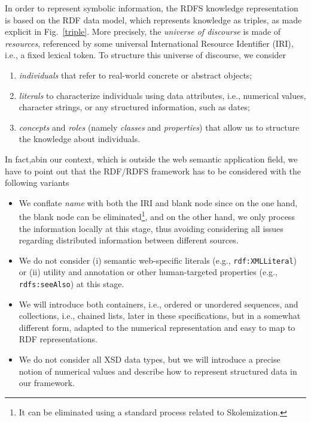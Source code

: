\documentclass[sn-mathphys]{sn-jnl}
\begin{document}
\begin{appendices}
In order to represent symbolic information, the RDFS knowledge representation is based on the RDF data model, which represents knowledge as triples, as made explicit in Fig.~\ref{triple}. More precisely, the \emph{universe of discourse} is made of \emph{resources}, referenced by some universal International Resource Identifier (IRI), i.e., a fixed lexical token. To structure this universe of discourse, we consider \begin{enumerate}[label=(\roman*)]
    \item \emph{individuals} that refer to real-world concrete or abstract objects; 
    \item \emph{literals} to characterize individuals using data attributes, i.e., numerical values, character strings, or any structured information, such as dates;
    \item \emph{concepts} and \emph{roles} (namely \emph{classes} and \emph{properties}) that allow us to structure the knowledge about individuals.
\end{enumerate}

In fact,abin our context, which is outside the web semantic application field, we have to point out that the RDF/RDFS framework has to be considered with the following variants
\begin{itemize}
    \item We conflate \emph{name} with both the IRI and blank node since on the one hand, the blank node can be eliminated\footnote{It can be eliminated using a standard process related to Skolemization.}, and on the other hand, we only process the information locally at this stage, thus avoiding considering all issues regarding distributed information between different sources.
    \item We do not consider (i) semantic web-specific literals (e.g., \texttt{rdf:XMLLiteral}) or (ii) utility and annotation or other human-targeted properties (e.g., \texttt{rdfs:seeAlso}) at this stage.
    \item We will introduce both containers, i.e., ordered or unordered sequences, and collections, i.e., chained lists, later in these specifications, but in a somewhat different form, adapted to the numerical representation and easy to map to RDF representations.
    \item We do not consider all XSD data types, but we will introduce a precise notion of numerical values and describe how to represent structured data in our framework.
\end{itemize}


\end{appendices}
\end{document}

